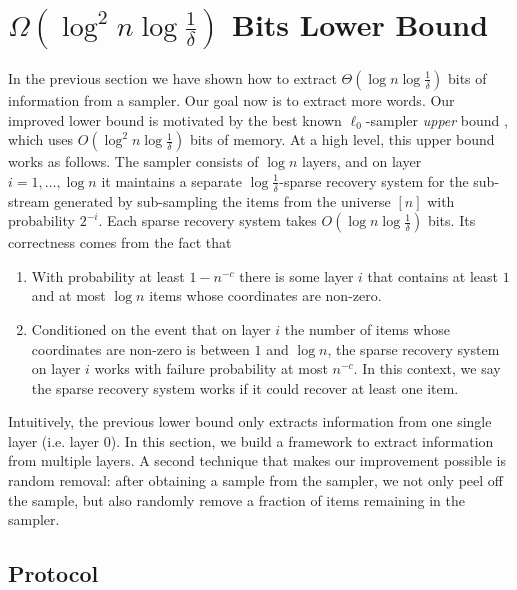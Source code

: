 \section{$\Omega(\log^2 n \log \frac{1}{\delta})$ Bits Lower Bound} \label{sec:optimal-lb}

In the previous section we have shown how to extract $\Theta(\log n\log \frac{1}{\delta})$ bits of information from a sampler. 
Our goal now is to extract more words. Our improved lower bound is motivated by the best known $\ell_0$-sampler {\em upper} bound \cite{JowhariST11}, which uses $O(\log^2 n\log \frac 1{\delta})$ bits of memory. At a high level, this upper bound works as follows. The sampler consists of $\log n$ layers, and on layer $i=1,\ldots, \log n$ it maintains a separate $\log \frac 1{\delta}$-sparse recovery system for the sub-stream generated by sub-sampling the items from the universe $[n]$ with probability $2^{-i}$. 
Each sparse recovery system takes $O(\log n\log \frac 1{\delta})$ bits.  Its correctness comes from the fact that 
\begin{enumerate}
  \item With probability at least $1-n^{-c}$ there is some layer $i$ that contains at least $1$ and at most $\log n$ items whose coordinates are non-zero. 
  \item Conditioned on the event that on layer $i$ the number of items whose coordinates are non-zero is between $1$ and $\log n$, the sparse recovery system on layer $i$ works with failure probability at most $n^{-c}$. In this context, we say the sparse recovery system works if it could recover at least one item. 
\end{enumerate}

Intuitively, the previous lower bound only extracts information from one single layer (i.e. layer $0$). In this section, we build a framework to extract information from multiple layers. A second technique that makes our improvement possible is random removal: after obtaining a sample from the sampler, we not only peel off the sample, but also randomly remove a fraction of items remaining in the sampler. 

\subsection{Protocol}

